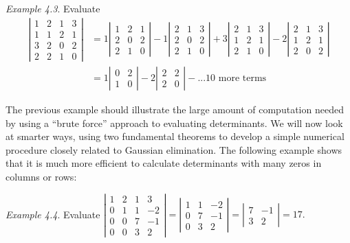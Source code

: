 \documentclass[
  letterpaper,
  DIV=11,
  numbers=noendperiod]{scrartcl}
\theoremstyle{remark}
\begin{document}
\emph{Example 4.3}. Evaluate \[\begin{aligned}
\left| 
\begin{array}{cccc}
1 & 2 & 1 & 3 \\ 
1 & 1 & 2 & 1 \\ 
3 & 2 & 0 & 2 \\ 
2 & 2 & 1 & 0
\end{array}
\right| & = 1\left| 
\begin{array}{ccc} 
 1 & 2 & 1 \\ 
 2 & 0 & 2 \\ 
 2 & 1 & 0
\end{array}
\right| - 1 \left| 
\begin{array}{ccc}
 2 & 1 & 3 \\ 
 2 & 0 & 2 \\ 
 2 & 1 & 0
\end{array}
\right|  + 3 \left| 
\begin{array}{ccc}
 2 & 1 & 3 \\ 
 1 & 2 & 1 \\ 
 2 & 1 & 0
\end{array}
\right| - 2 \left| 
\begin{array}{ccc}
 2 & 1 & 3 \\ 
 1 & 2 & 1 \\ 
 2 & 0 & 2 \end{array}
\right| \\
& = 1\left| 
\begin{array}{cc} 
 0 & 2 \\ 
 1 & 0
\end{array}
\right| -2  \left|\begin{array}{cc} 
 2& 2 \\ 
 2 & 0
\end{array}
\right|  - ... \mbox{10 more terms} 
\end{aligned}\]

The previous example should illustrate the large amount of computation
needed by using a ``brute force'' approach to evaluating determinants.
We will now look at smarter ways, using two fundamental theorems to
develop a simple numerical procedure closely related to Gaussian
elimination. The following example shows that it is much more efficient
to calculate determinants with many zeros in columns or rows:

\emph{Example 4.4}. Evaluate \(\left|
\begin{array}{cccc}
1 & 2 & 1 & 3 \\
0 & 1 & 1 & -2 \\
0 & 0 & 7 & -1 \\
0 & 0 & 3 & 2
\end{array}
\right| =\left|
\begin{array}{ccc}
1 & 1 & -2 \\
0 & 7 & -1 \\
0 & 3 & 2
\end{array}
\right| =\left|
\begin{array}{cc}
7 & -1 \\
3 & 2
\end{array}
\right| =\allowbreak 17.\)
\end{document}
